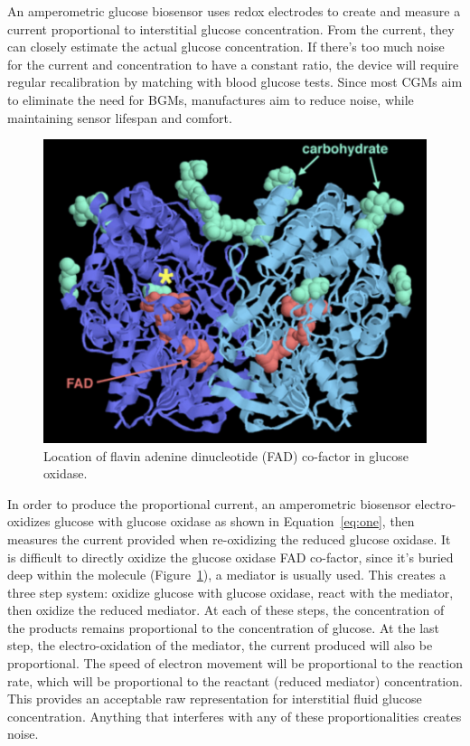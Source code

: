 An amperometric glucose biosensor uses redox electrodes to create and measure a current proportional to interstitial glucose concentration. From the current, they can closely estimate the actual glucose concentration. If there’s too much noise for the current and concentration to have a constant ratio, the device will require regular recalibration by matching with blood glucose tests. Since most CGMs aim to eliminate the need for BGMs, manufactures aim to reduce noise, while maintaining sensor lifespan and comfort.

\begin{figure}[ht]
\centering\includegraphics[width=1.0\linewidth]{images/mom.png}
\caption{Location of flavin adenine dinucleotide (FAD) co-factor in glucose oxidase.}
\label{fig:mom}
\end{figure}

In order to produce the proportional current, an amperometric biosensor electro-oxidizes glucose with glucose oxidase as shown in Equation~\ref{eq:one}, then measures the current provided when re-oxidizing the reduced glucose oxidase. It is difficult to directly oxidize the glucose oxidase FAD co-factor, since it’s buried deep within the molecule (Figure~\ref{fig:mom}), a mediator is usually used. This creates a three step system: oxidize glucose with glucose oxidase, react with the mediator, then oxidize the reduced mediator. At each of these steps, the concentration of the products remains proportional to the concentration of glucose. At the last step, the electro-oxidation of the mediator, the current produced will also be proportional. The speed of electron movement will be proportional to the reaction rate, which will be proportional to the reactant (reduced mediator) concentration\cite{noauthor_amperometric_nodate}. This provides an acceptable raw representation for interstitial fluid glucose concentration. Anything that interferes with any of these proportionalities creates noise.

